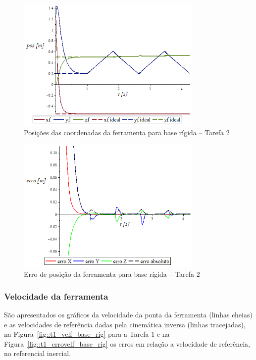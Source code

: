 \begin{figure}[h!]
	\centering 
 	\includegraphics[width=0.80\textwidth]{figs/t2_posf_base_rig}
 	\caption{Posições das coordenadas da ferramenta para base rígida -- Tarefa 2}
 	\label{fig::t2_posf_base_rig}
\end{figure}

\begin{figure}[h!]
	\centering 
 	\includegraphics[width=0.80\textwidth]{figs/t2_erroposf_base_rig}
 	\caption{Erro de posição da ferramenta para base rígida -- Tarefa 2}
 	\label{fig::t2_erroposf_base_rig}
\end{figure}


\subsubsection{Velocidade da ferramenta}

São apresentados os gráficos da velocidade da ponta da ferramenta (linhas
cheias) e as velocidades de referência dadas pela cinemática inversa (linhas
tracejadas), na Figura~\ref{fig::t1_velf_base_rig} para a Tarefa 1 e na
Figura~\ref{fig::t1_errovelf_base_rig} os erros em relação a velocidade de
referência, no referencial inercial.


